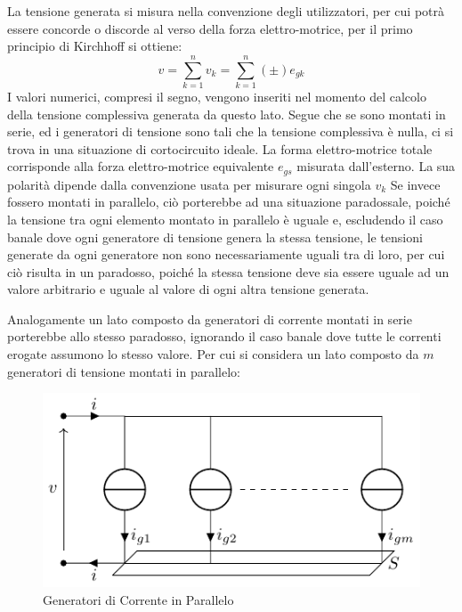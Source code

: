 \documentclass{article}
\numberwithin{equation}{subsection}
\begin{document}
La tensione generata si misura nella convenzione degli utilizzatori, per cui potrà essere concorde o discorde al verso della forza elettro-motrice, per il 
primo principio di Kirchhoff si ottiene:
\begin{equation*}
    v=\displaystyle\sum_{k=1}^nv_k=\sum_{k=1}^n(\pm)e_{gk}
\end{equation*}
I valori numerici, compresi il segno, vengono inseriti nel momento del calcolo della tensione complessiva generata da questo lato. Segue che se sono montati in serie, 
ed i generatori di tensione sono tali che la tensione complessiva è nulla, ci si trova in una situazione di cortocircuito ideale. La forma elettro-motrice totale 
corrisponde alla forza elettro-motrice equivalente $e_{gs}$ misurata dall'esterno. La sua polarità dipende dalla convenzione usata per misurare ogni singola $v_k$
Se invece fossero montati in parallelo, ciò porterebbe ad una situazione paradossale, poiché la tensione tra ogni elemento montato in parallelo è uguale e, escludendo il caso 
banale dove ogni generatore di tensione genera la stessa tensione, le tensioni generate da ogni generatore non sono necessariamente uguali tra di loro, per cui ciò risulta 
in un paradosso, poiché la stessa tensione deve sia essere uguale ad un valore arbitrario e uguale al valore di ogni altra tensione generata. 



Analogamente un lato composto da generatori di corrente montati in serie porterebbe allo stesso paradosso, ignorando il caso banale dove tutte le correnti erogate assumono 
lo stesso valore. Per cui si considera un lato composto da $m$ generatori di tensione montati in parallelo:

\begin{figure}[H]%
    \centering
    \includegraphics{generatore-corrente-parallelo.pdf}
    \caption{Generatori di Corrente in Parallelo}
    \label{fig:generatore-corrente-parallelo}
\end{figure}
\end{document}
